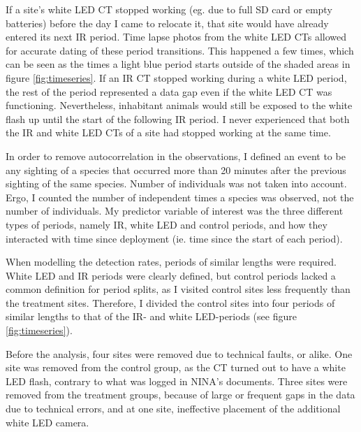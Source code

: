 If a site's white LED CT stopped working (eg. due to full SD card or empty batteries) before the day I came to relocate it, that site would have already entered its next IR period.
Time lapse photos from the white LED CTs allowed for accurate dating of these period transitions.
This happened a few  %
times, which can be seen as the times a light blue period starts outside of the shaded areas in figure \ref{fig:timeseries}. 
If an IR CT stopped working during a white LED period, the rest of the period represented a data gap even if the white LED CT was functioning. 
Nevertheless, inhabitant animals would still be exposed to the white flash up until the start of the following IR period.
I never experienced that both the IR and white LED CTs of a site had stopped working at the same time.


In order to remove autocorrelation in the observations, I defined an event to be any sighting of a species that occurred more than 20 minutes after the previous sighting of the same species.
Number of individuals was not taken into account.
Ergo, I counted the number of independent times a species was observed, not the number of individuals.
My predictor variable of interest was the three different types of periods, namely IR, white LED and control periods, and how they interacted with time since deployment (ie. time since the start of each period).


When modelling the detection rates, periods of similar lengths were required.
White LED and IR periods were clearly defined, but control periods lacked a common definition for period splits, as I visited control sites less frequently than the treatment sites.
Therefore, I divided the control sites into four periods of similar lengths to that of the IR- and white LED-periods (see figure \ref{fig:timeseries}). 


Before the analysis, four sites were removed due to technical faults, or alike.
One site was removed from the control group, as the CT turned out to have a white LED flash, contrary to what was logged in NINA's documents.
Three sites were removed from the treatment groups, because of large or frequent gaps in the data due to technical errors, and at one site, ineffective placement of the additional white LED camera. 



